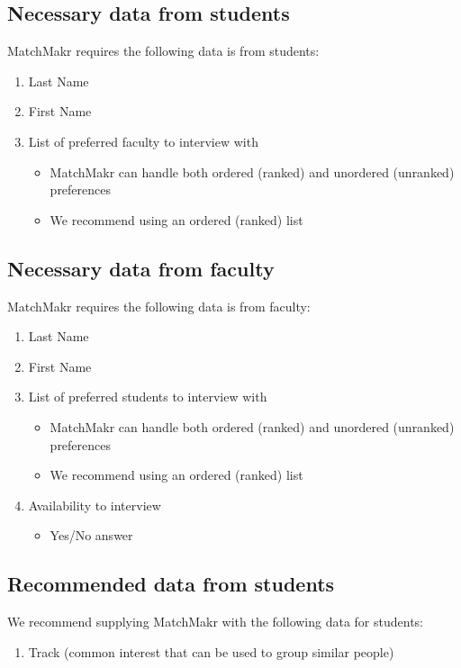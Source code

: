 \subsection{Necessary data from students}
MatchMakr requires the following data is from students:
\begin{enumerate}
	\itemsep0em
	\item Last Name
	\item First Name
	\item List of preferred faculty to interview with
	\begin{itemize}
	\itemsep0em
		\item MatchMakr can handle both ordered (ranked) and unordered (unranked) preferences
		\item We recommend using an ordered (ranked) list
	\end{itemize}
\end{enumerate}

\subsection{Necessary data from faculty}
MatchMakr requires the following data is from faculty:
\begin{enumerate}
	\itemsep0em
	\item Last Name
	\item First Name
	\item List of preferred students to interview with
	\begin{itemize}
		\itemsep0em
		\item MatchMakr can handle both ordered (ranked) and unordered (unranked) preferences
		\item We recommend using an ordered (ranked) list
	\end{itemize}
	\item Availability to interview
	\begin{itemize}
		\itemsep0em
		\item Yes/No answer
	\end{itemize}
\end{enumerate}

\subsection{Recommended data from students}
We recommend supplying MatchMakr with the following data for students:
\begin{enumerate}
	\itemsep0em
	\item Track (common interest that can be used to group similar people)
\end{enumerate}

